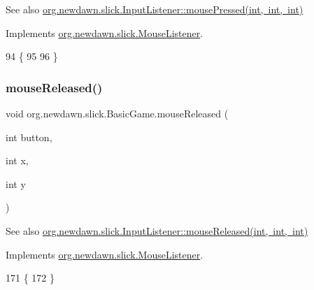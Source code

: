 \begin{DoxySeeAlso}{See also}
\mbox{\hyperlink{interfaceorg_1_1newdawn_1_1slick_1_1_mouse_listener_aeca4c21a38aa31c408f3daf6f86c0925}{org.\+newdawn.\+slick.\+Input\+Listener\+::mouse\+Pressed(int, int, int)}} 
\end{DoxySeeAlso}


Implements \mbox{\hyperlink{interfaceorg_1_1newdawn_1_1slick_1_1_mouse_listener_aeca4c21a38aa31c408f3daf6f86c0925}{org.\+newdawn.\+slick.\+Mouse\+Listener}}.


\begin{DoxyCode}
94                                                        \{
95 
96     \}
\end{DoxyCode}
\mbox{\label{classorg_1_1newdawn_1_1slick_1_1_basic_game_ad5f3b68d103dc42613e5a35c7f820f72}} 
\subsubsection{\texorpdfstring{mouse\+Released()}{mouseReleased()}}
{\footnotesize\ttfamily void org.\+newdawn.\+slick.\+Basic\+Game.\+mouse\+Released (\begin{DoxyParamCaption}\item[{int}]{button,  }\item[{int}]{x,  }\item[{int}]{y }\end{DoxyParamCaption})\hspace{0.3cm}{\ttfamily [inline]}}

\begin{DoxySeeAlso}{See also}
\mbox{\hyperlink{interfaceorg_1_1newdawn_1_1slick_1_1_mouse_listener_a8d1606869f610664f9299565067d5571}{org.\+newdawn.\+slick.\+Input\+Listener\+::mouse\+Released(int, int, int)}} 
\end{DoxySeeAlso}


Implements \mbox{\hyperlink{interfaceorg_1_1newdawn_1_1slick_1_1_mouse_listener_a8d1606869f610664f9299565067d5571}{org.\+newdawn.\+slick.\+Mouse\+Listener}}.


\begin{DoxyCode}
171                                                         \{
172     \}
\end{DoxyCode}
\mbox{\label{classorg_1_1newdawn_1_1slick_1_1_basic_game_a28f0cdd4678843d738312a0fa49d5cc3}} 
